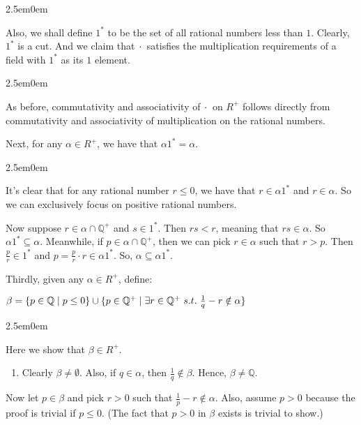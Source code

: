 \documentclass{book}
\newcommand{\exTwo}{%
\color{Purple}%
   \fontsize{13}{15}\selectfont%
}
\newcommand{\exP}{%
   \color{Purple}%
   \fontsize{12}{14}\selectfont%
}
\newenvironment{myIndent}{%
   \begin{adjustwidth}{2.5em}{0em}%
}{%
   \end{adjustwidth}%
}
\newcommand{\suchthat}{ \hspace{0.3em}s.t.\hspace{0.3em}}
\newcommand{\retTwo}{\hfill\bigbreak}
\begin{document}
\begin{myIndent}
      Also, we shall define $1^*$ to be the set of all rational numbers less than $1$. Clearly, $1^*$ is a cut. And we claim that $\hspace{0.1em}\cdot\hspace{0.1em}$ satisfies the multiplication requirements of a field with $1^*$ as its $1$ element.\newpage

      \begin{myIndent}\exTwo
         As before, commutativity and associativity of $\hspace{0.1em}\cdot\hspace{0.1em}$ on $R^+$ follows directly from commutativity and associativity of multiplication on the rational numbers.\retTwo

         Next, for any $\alpha \in R^+$, we have that $\alpha 1^* = \alpha$.
         \begin{myIndent}\exP
            It's clear that for any rational number $r \leq 0$, we have that $r \in \alpha 1^*$ and $r \in \alpha$. So we can exclusively focus on positive rational numbers.\retTwo
            
            Now suppose $r \in \alpha \cap \mathbb{Q}^+$ and $s \in 1^*$. Then $rs < r$, meaning that $rs \in \alpha$. So $\alpha 1^* \subseteq \alpha$. Meanwhile, if $p \in \alpha \cap \mathbb{Q}^+$, then we can pick $r \in \alpha$ such that $r > p$. Then $\frac{p}{r} \in 1^*$ and $p = \frac{p}{r} \cdot r \in \alpha 1^*$. So, $\alpha \subseteq \alpha 1^*$.\retTwo
         \end{myIndent}

         Thirdly, given any $\alpha \in R^+$, define:

         \begin{centering}
            $\beta = \{p \in \mathbb{Q} \mid p \leq 0\} \cup \{p \in \mathbb{Q}^+ \mid \exists r \in \mathbb{Q}^+ \suchthat \frac{1}{q} - r \notin \alpha\}$\retTwo\par
         \end{centering}

         \begin{myIndent}\exP
            Here we show that $\beta \in R^+$.
            \begin{enumerate}
               \item Clearly $\beta \neq \emptyset$. Also, if $q \in \alpha$, then $\frac{1}{q} \notin \beta$. Hence, $\beta \neq \mathbb{Q}$.\retTwo
            \end{enumerate}

            Now let $p \in \beta$ and pick $r > 0$ such that $\frac{1}{p} - r \notin \alpha$. Also, assume $p > 0$ because the proof is trivial if $p \leq 0$. (The fact that $p > 0$ in $\beta$ exists is trivial to show.)\retTwo


\end{myIndent}
\end{myIndent}
\end{myIndent}
\end{document}
